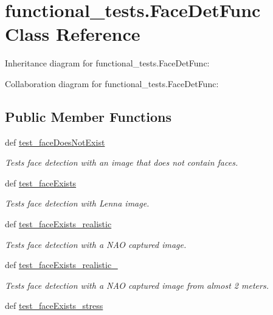 \hypertarget{classfunctional__tests_1_1FaceDetFunc}{\section{functional\-\_\-tests.\-Face\-Det\-Func Class Reference}
\label{classfunctional__tests_1_1FaceDetFunc}
}


Inheritance diagram for functional\-\_\-tests.\-Face\-Det\-Func\-:


Collaboration diagram for functional\-\_\-tests.\-Face\-Det\-Func\-:
\subsection*{Public Member Functions}
\begin{DoxyCompactItemize}
\item 
def \hyperlink{classfunctional__tests_1_1FaceDetFunc_ad00297274fd209b5417544feca4e2202}{test\-\_\-face\-Does\-Not\-Exist}
\begin{DoxyCompactList}\small\item\em Tests face detection with an image that does not contain faces. \end{DoxyCompactList}\item 
def \hyperlink{classfunctional__tests_1_1FaceDetFunc_acf87b7486a14e8cb90711b205ed59fdc}{test\-\_\-face\-Exists}
\begin{DoxyCompactList}\small\item\em Tests face detection with Lenna image. \end{DoxyCompactList}\item 
def \hyperlink{classfunctional__tests_1_1FaceDetFunc_a172b3f268ec490f02df4af12f14fc245}{test\-\_\-face\-Exists\-\_\-realistic}
\begin{DoxyCompactList}\small\item\em Tests face detection with a N\-A\-O captured image. \end{DoxyCompactList}\item 
def \hyperlink{classfunctional__tests_1_1FaceDetFunc_ac4f8c1308171f3b2e2ee364a125d688f}{test\-\_\-face\-Exists\-\_\-realistic\-\_}
\begin{DoxyCompactList}\small\item\em Tests face detection with a N\-A\-O captured image from almost 2 meters. \end{DoxyCompactList}\item 
def \hyperlink{classfunctional__tests_1_1FaceDetFunc_a07f7b9fb313461bbe4dd8625c44797b3}{test\-\_\-face\-Exists\-\_\-stress}

\end{DoxyCompactItemize}
